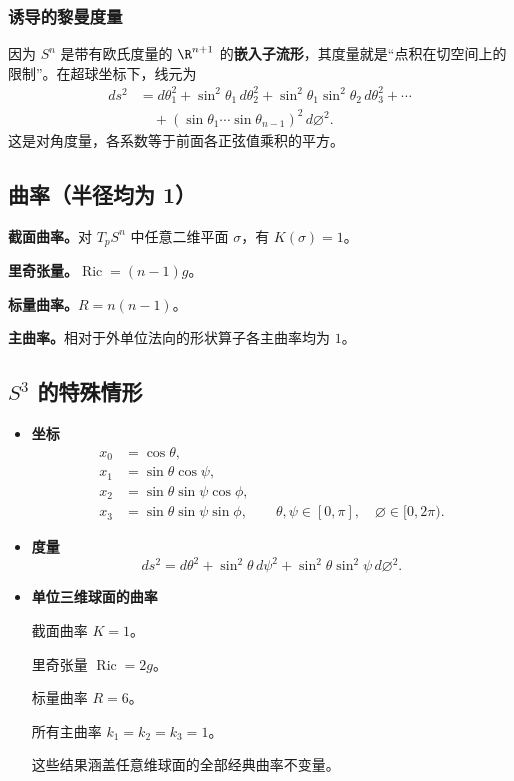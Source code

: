 \subsubsection{诱导的黎曼度量}
因为 $S^n$ 是带有欧氏度量的 $\R^{n+1}$ 的\textbf{嵌入子流形}，其度量就是“点积在切空间上的限制”。在超球坐标下，线元为
\[
  \begin{aligned}
    ds^2&=d\theta_1^2+\sin^2\theta_1\,d\theta_2^2
          +\sin^2\theta_1\sin^2\theta_2\,d\theta_3^2+\cdots\\
        &\quad+(\sin\theta_1\cdots\sin\theta_{n-1})^2\,d\varnothing^2.
  \end{aligned}
\]
这是对角度量，各系数等于前面各正弦值乘积的平方。

\subsection{曲率（半径均为 1）}
\textbf{截面曲率。}对 $T_pS^n$ 中任意二维平面 $\sigma$，有 $K(\sigma)=1$。

\textbf{里奇张量。}$\operatorname{Ric}=(n-1)g$。

\textbf{标量曲率。}$R=n(n-1)$。

\textbf{主曲率。}相对于外单位法向的形状算子各主曲率均为 $1$。

\subsection{\texorpdfstring{$S^3$}{S³} 的特殊情形}
\begin{itemize}
  \item \textbf{坐标}
  \[
    \begin{aligned}
      x_0&=\cos\theta,\\
      x_1&=\sin\theta\cos\psi,\\
      x_2&=\sin\theta\sin\psi\cos\phi,\\
      x_3&=\sin\theta\sin\psi\sin\phi,
      \qquad \theta,\psi\in[0,\pi],\quad\varnothing\in[0,2\pi).
    \end{aligned}
  \]
  \item \textbf{度量}
  \[
    ds^2=d\theta^2+\sin^2\theta\,d\psi^2
          +\sin^2\theta\sin^2\psi\,d\varnothing^2.
  \]
  \item \textbf{单位三维球面的曲率}

  截面曲率 $K=1$。

  里奇张量 $\operatorname{Ric}=2g$。

  标量曲率 $R=6$。

  所有主曲率 $k_1=k_2=k_3=1$。

  这些结果涵盖任意维球面的全部经典曲率不变量。
\end{itemize}

